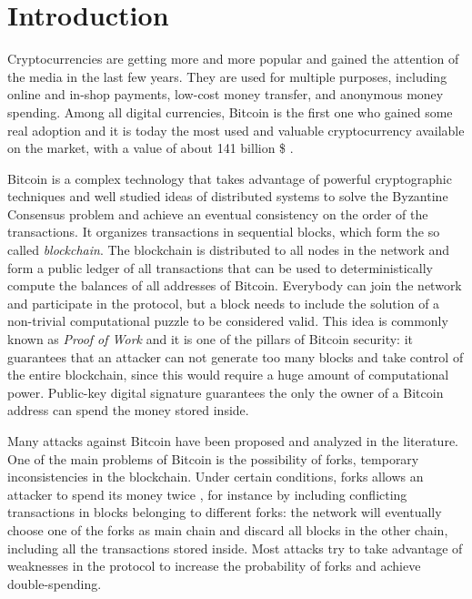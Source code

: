 \chapter{Introduction}
Cryptocurrencies are getting more and more popular and gained the attention of the media in the last few years.
They are used for multiple purposes, including online and in-shop payments, low-cost money transfer, and anonymous money spending.
Among all digital currencies, Bitcoin is the first one who gained some real adoption and it is today the most used and valuable cryptocurrency available on the market, with a value of about \num{141} billion \$ \cite{bitcoin_usage_study_2017, stats_coinmarketcap}.

Bitcoin is a complex technology that takes advantage of powerful cryptographic techniques and well studied ideas of distributed systems to solve the Byzantine Consensus problem and achieve an eventual consistency on the order of the transactions.
It organizes transactions in sequential blocks, which form the so called \textit{blockchain}.
The blockchain is distributed to all nodes in the network and form a public ledger of all transactions that can be used to deterministically compute the balances of all addresses of Bitcoin.
Everybody can join the network and participate in the protocol, but a block needs to include the solution of a non-trivial computational puzzle to be considered valid.
This idea is commonly known as \textit{Proof of Work} \cite{pow_2002} and it is one of the pillars of Bitcoin security:
it guarantees that an attacker can not generate too many blocks and take control of the entire blockchain, since this would require a huge amount of computational power.
Public-key digital signature guarantees the only the owner of a Bitcoin address can spend the money stored inside.

Many attacks against Bitcoin have been proposed and analyzed in the literature.
One of the main problems of Bitcoin is the possibility of forks, temporary inconsistencies in the blockchain.
Under certain conditions, forks allows an attacker to spend its money twice \cite{double_spending_two_for_one}, for instance by including conflicting transactions in blocks belonging to different forks:
the network will eventually choose one of the forks as main chain and discard all blocks in the other chain, including all the transactions stored inside.
Most attacks try to take advantage of weaknesses in the protocol to increase the probability of forks and achieve double-spending.


